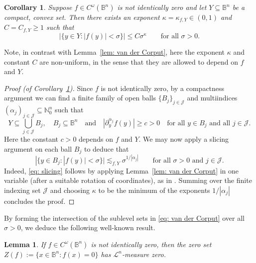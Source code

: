 \documentclass[reqno]{amsart}
\numberwithin{equation}{section}
\newcommand{\B}{\mathbb{B}}
\newcommand{\N}{\mathbb{N}}
\newcommand{\cJ}{\mathcal{J}}
\newcommand{\cL}{\mathcal{L}}
\theoremstyle{plain}
\newtheorem{lemma}[theorem]{Lemma}
\newtheorem{corollary}[theorem]{Corollary}
\theoremstyle{definition}
\begin{document}
\begin{corollary}\label{cor: van der Corput} Suppose $f \in C^{\omega}(\B^n)$ is not identically zero and let $Y \subseteq \B^n$ be a compact, convex set. Then there exists an exponent $\kappa = \kappa_{f,Y} \in (0,1)$ and $C = C_{f,Y} \geq 1$ such that
\begin{equation}\label{eq: van der Corput}
    |\{y \in Y : |f(y)| < \sigma \}| \leq C \sigma^{\kappa} \qquad \textrm{for all $\sigma > 0$.}
\end{equation}
\end{corollary}

Note, in contrast with Lemma~\ref{lem: van der Corput}, here the exponent $\kappa$ and constant $C$ are non-uniform, in the sense that they are allowed to depend on $f$ and $Y$.

\begin{proof}[Proof (of Corollary~\ref{cor: van der Corput})] Since $f$ is not identically zero, by a compactness argument we can find a finite family of open balls $\{B_j\}_{j \in \cJ}$ and multiindices $(\alpha_j)_{j \in \cJ} \subseteq \N_0^n$ such that
\begin{equation*}
    Y \subseteq \bigcup_{j \in \cJ} B_j,  \quad B_j \subseteq \B^n\quad \textrm{and} \quad |\partial^{\alpha_j}_y f(y)| \geq c > 0 \quad \textrm{for all $y \in B_j$ and all $j \in \cJ$.}
\end{equation*}
Here the constant $c > 0$ depends on $f$ and $Y$. We may now apply a slicing argument on each ball $B_j$ to deduce that
\begin{equation}\label{eq: slicing}
    |\{ y \in B_j : |f(y)| < \sigma \}| \lesssim_{f,Y} \sigma^{1/|\alpha_j|}  \qquad \textrm{for all $\sigma > 0$ and $j \in \cJ$.}
\end{equation}
Indeed, \eqref{eq: slicing} follows by applying Lemma~\ref{lem: van der Corput} in one variable (after a suitable rotation of coordinates), as in \cite[Lemma 3.4]{Christ1985}. Summing over the finite indexing set $\cJ$ and choosing $\kappa$ to be the minimum of the exponents $1/|\alpha_j|$ concludes the proof. 
\end{proof}

By forming the intersection of the sublevel sets in \eqref{eq: van der Corput} over all $\sigma > 0$, we deduce the following well-known result.

\begin{lemma}\label{cor: meas zero} If $f \in C^{\omega}(\B^n)$ is not identically zero, then the zero set $Z(f) := \{x \in \B^n : f(x) = 0\}$ has $\cL^n$-measure zero. 
\end{lemma}
\end{document}
